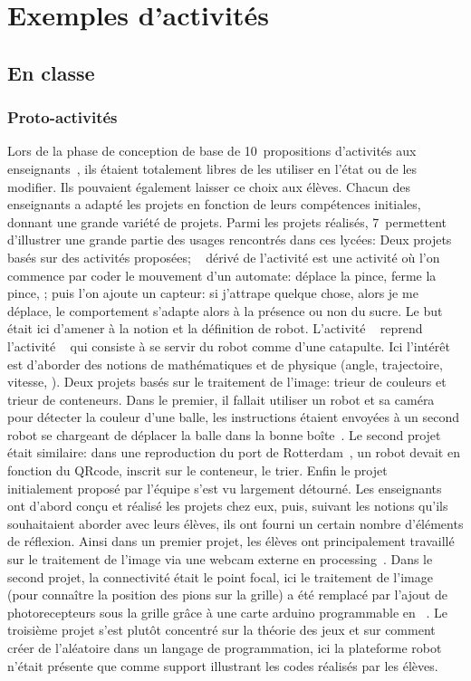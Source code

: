 \section{Exemples d'activités}
    \subsection{En classe}
        \subsubsection{Proto-activités}\label{sec:proto-act}
            Lors de la phase de conception de base de 10~propositions d'activités aux enseignants~, ils étaient totalement libres de les utiliser en l'état ou de les modifier. Ils pouvaient également laisser ce choix aux élèves. Chacun des enseignants a adapté les projets en fonction de leurs compétences initiales, donnant une grande variété de projets. Parmi les projets réalisés, 7~permettent d'illustrer une grande partie des usages rencontrés dans ces lycées:
            Deux projets basés sur des activités proposées;  ~ dérivé de l'activité   est une activité où l'on commence par coder le mouvement d'un automate: déplace la pince, ferme la pince, \etc; puis l'on ajoute un capteur: si j'attrape quelque chose, alors je me déplace, le comportement s'adapte alors à la présence ou non du sucre. Le but était ici d'amener à la notion et la définition de robot. 
            L'activité  ~ reprend l'activité  ~ qui consiste à se servir du robot comme d'une catapulte. Ici l'intérêt est d'aborder des notions de mathématiques et de physique (\eg angle, trajectoire, vitesse, \etc). 
            Deux projets basés sur le traitement de l'image: trieur de couleurs et trieur de conteneurs. Dans le premier, il fallait utiliser un robot et sa caméra pour détecter la couleur d'une balle, les instructions étaient envoyées à un second robot se chargeant de déplacer la balle dans la bonne boîte~. Le second projet était similaire: dans une reproduction du port de Rotterdam~, un robot devait en fonction du QRcode, inscrit sur le conteneur, le trier.
            Enfin le projet  ~ initialement proposé par l'équipe s'est vu largement détourné. Les enseignants ont d'abord conçu et réalisé les projets chez eux, puis, suivant les notions qu'ils souhaitaient aborder avec leurs élèves, ils ont fourni un certain nombre d'éléments de réflexion. Ainsi dans un premier projet, les élèves ont principalement travaillé sur le traitement de l'image via une webcam externe en processing~. Dans le second projet, la connectivité était le point focal, ici le traitement de l'image (pour connaître la position des pions sur la grille) a été remplacé par l'ajout de photorecepteurs sous la grille grâce à une carte arduino programmable en ~. Le troisième projet s'est plutôt concentré sur la théorie des jeux et sur comment créer de l'aléatoire dans un langage de programmation, ici la plateforme robot n'était présente que comme support illustrant les codes réalisés par les élèves.
